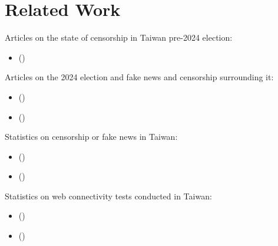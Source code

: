 \section{Related Work}\label{sec:related}

Articles on the state of censorship in Taiwan pre-2024 election:
\begin{itemize}
    \item (\cite{perspectives-taiwan})
\end{itemize}

Articles on the 2024 election and fake news and censorship surrounding it:
\begin{itemize}
    \item (\cite{npr-taiwan-misinfo})
    \item (\cite{ap-taiwan-misinfo})
\end{itemize}

Statistics on censorship or fake news in Taiwan:
\begin{itemize}
    \item (\cite{freedom-house-taiwan-22})
    \item (\cite{freedom-house-taiwan-23})
\end{itemize}

Statistics on web connectivity tests conducted in Taiwan:
\begin{itemize}
    \item (\cite{ooni-explorer})
    \item (\cite{Cho_CoNEXT17})
\end{itemize}